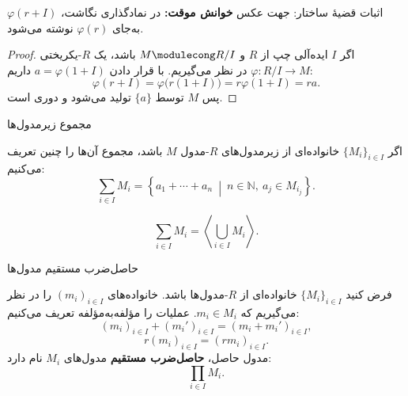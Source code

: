 \begin{frame}{اثبات قضیهٔ ساختار: جهت عکس}
    \label{lec04:cyclic-proof-converse}
    \textbf{خوانش موقت:} در نمادگذاری نگاشت، $\varphi(r+I)$ به‌جای
    $\varphi(r)$ نوشته می‌شود. \lr{[L04-Q03]}

    \begin{proof}
        اگر $I$ ایده‌آلی چپ از $R$ و $M\modulecong R/I$ باشد،
        یک $R$-یکریختی $\varphi:R/I\to M$ در نظر می‌گیریم.
        با قرار دادن $a=\varphi(1+I)$ داریم:
        \[
            \varphi(r+I)=\varphi\bigl(r(1+I)\bigr)
            =r\varphi(1+I)=ra.
        \]
        پس $M$ توسط $\{a\}$ تولید می‌شود و دوری است.
    \end{proof}
\end{frame}

\begin{frame}{مجموع زیرمدول‌ها}
    \label{lec04:sum-submodules}
    \begin{definition}
        اگر $\{M_i\}_{i\in I}$ خانواده‌ای از زیرمدول‌های $R$-مدول $M$ باشد،
        مجموع آن‌ها را چنین تعریف می‌کنیم:
        \[
            \sum_{i\in I}M_i=
            \left\{a_1+\cdots+a_n\ \middle|\
            n\in\mathbb N,\ a_j\in M_{i_j}\right\}.
        \]
    \end{definition}
    \begin{lemma}
        \[
            \sum_{i\in I}M_i=
            \left\langle\bigcup_{i\in I}M_i\right\rangle.
        \]
    \end{lemma}
\end{frame}

\begin{frame}{حاصل‌ضرب مستقیم مدول‌ها}
    \label{lec04:direct-product}
    \begin{definition}
        فرض کنید $\{M_i\}_{i\in I}$ خانواده‌ای از $R$-مدول‌ها باشد.
        خانواده‌های $(m_i)_{i\in I}$ را در نظر می‌گیریم که $m_i\in M_i$.
        عملیات را مؤلفه‌به‌مؤلفه تعریف می‌کنیم:
        \[
            (m_i)_{i\in I}+(m_i')_{i\in I}
            =(m_i+m_i')_{i\in I},
        \]
        \[
            r(m_i)_{i\in I}=(rm_i)_{i\in I}.
        \]
        مدول حاصل، \textbf{حاصل‌ضرب مستقیم} مدول‌های $M_i$ نام دارد:
        \[
            \prod_{i\in I}M_i.
        \]
    \end{definition}
\end{frame}

